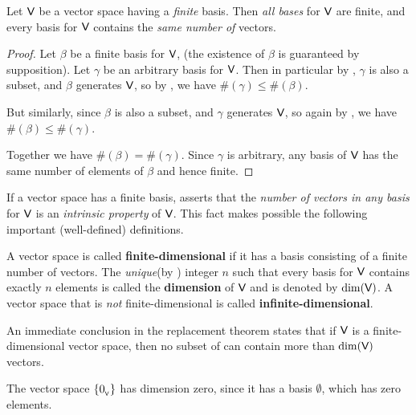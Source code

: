 \begin{corollary} \label{corollary 1.10.1}
Let \(\textsf{V}\) be a vector space having a \emph{finite} basis.
Then \emph{all bases} for \(\textsf{V}\) are finite, and every basis for \(\textsf{V}\) contains the \emph{same number of} vectors.
\end{corollary}

\begin{proof}
Let \(\beta\) be a finite basis for \(\textsf{V}\), (the existence of \(\beta\) is guaranteed by supposition).
Let \(\gamma\) be an arbitrary basis for \(\textsf{V}\).
Then in particular by , \(\gamma\) is also a \LID{} subset, and \(\beta\) generates \(\textsf{V}\), so by , we have \(\#(\gamma) \le \#(\beta)\).

But similarly, since \(\beta\) is also a \LID{} subset, and \(\gamma\) generates \(\textsf{V}\), so again by , we have \(\#(\beta) \le \#(\gamma)\).

Together we have \(\#(\beta) = \#(\gamma)\).
Since \(\gamma\) is arbitrary, any basis of \(\textsf{V}\) has the same number of elements of \(\beta\) and hence finite.
\end{proof}

\begin{remark} \label{remark 1.6.3}
If a vector space has a finite basis,  asserts that the \emph{number of vectors in any basis} for \(\textsf{V}\) is an \emph{intrinsic property} of \(\textsf{V}\).
This fact makes possible the following important (well-defined) definitions.
\end{remark}

\begin{definition} \label{def 1.9}
A vector space is called \textbf{finite-dimensional} if it has a basis consisting of a finite number of vectors.
The \emph{unique}(by ) integer \(n\) such that every basis for \(\textsf{V}\) contains exactly \(n\) elements is called the \textbf{dimension} of \(\textsf{V}\) and is denoted by \(\dim(\textsf{V})\).
A vector space that is \emph{not} finite-dimensional is called \textbf{infinite-dimensional}.
\end{definition}

\begin{corollary} \label{corollary 1.10.2}
An immediate conclusion in the replacement theorem states that if \(\textsf{V}\) is a finite-dimensional vector space, then no \LID{} subset of \V can contain more than \(\dim(\textsf{V})\) vectors.
\end{corollary}

\begin{example} \label{example 1.6.7}
The vector space \(\{ 0_{_{\textsf{V}}} \}\) has dimension zero, since it has a basis \(\emptyset\), which has zero elements.
\end{example}

